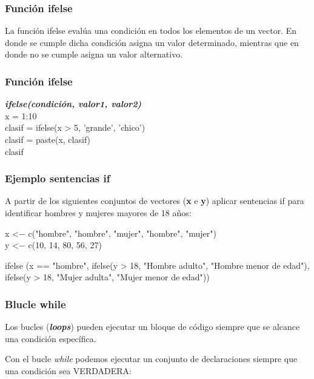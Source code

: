 \documentclass[11pt]{beamer}
\begin{document}
		\begin{frame}
		\frametitle{Función ifelse}
		
		La función ifelse evalúa una condición en todos los elementos de un vector. En donde se cumple dicha condición asigna un valor determinado, mientras que en donde no se cumple asigna un valor alternativo.
		
	\end{frame}

	\begin{frame}
		\frametitle{Función ifelse}
		
		\textbf{\textit{ifelse(condición, valor1, valor2)}}\\
		
		x = 1:10\\
		clasif = ifelse(x > 5, 'grande', 'chico')\\
		clasif = paste(x, clasif)\\
		clasif
	\end{frame}
	
	\begin{frame}
		\frametitle{Ejemplo sentencias if}
		
		A partir de los siguientes conjuntos de vectores (\textbf{x} e  \textbf{y}) aplicar sentencias if para identificar hombres y mujeres mayores de 18 años:\\
		\vspace{1cm}
		
		x <$-$ c("hombre", "hombre", "mujer", "hombre", "mujer")\\
		y <$-$ c(10, 14, 80, 56, 27)\\
		\vspace{1cm}
		
		ifelse (x == "hombre", ifelse(y > 18, "Hombre adulto", "Hombre menor de edad"), ifelse(y > 18, "Mujer adulta", "Mujer menor de edad"))
		
	\end{frame}

	\begin{frame}
		\frametitle{Blucle while}
		
		Los bucles (\textbf{\textit{loops}}) pueden ejecutar un bloque de código siempre que se alcance una condición específica.\\
		\vspace{1cm}
		
		Con el bucle \textit{while} podemos ejecutar un conjunto de declaraciones siempre que una condición sea VERDADERA:
		
	\end{frame}
\end{document}
